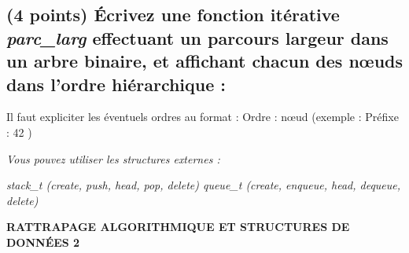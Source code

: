 \documentclass[11pt,a4paper]{article}
\begin{document}
\clearpage

\subsection{(4 points) \'Ecrivez une fonction itérative \og \textit{parc\_larg} \fg{} effectuant un parcours largeur dans un arbre binaire, et affichant chacun des nœuds dans l'ordre hiérarchique : }

\noindent Il faut expliciter les éventuels ordres au format : \og Ordre : nœud \fg{} (exemple : \og Préfixe : 42 \fg{})

\medskip

\noindent \textit{Vous pouvez utiliser les structures externes :}

\noindent \textit{stack\_t (create, push, head, pop, delete) \hfill queue\_t (create, enqueue, head, dequeue, delete) }

\begin{center}
\end{center}




\clearpage


\vfillFirst

\begin{center}

\begin{LARGE}
\textbf{RATTRAPAGE ALGORITHMIQUE ET STRUCTURES DE DONN\'EES 2}
\end{LARGE}

\end{center}

\vfillLast
\end{document}
